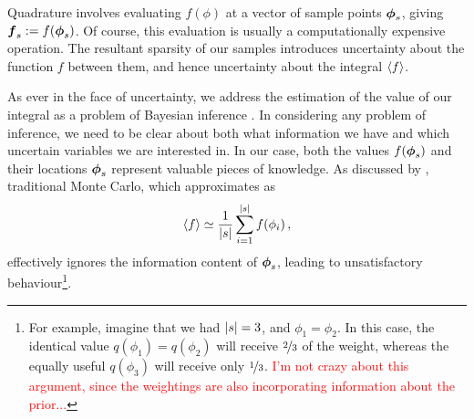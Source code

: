 \documentclass{article}
\begin{document}
Quadrature involves evaluating $f(\phi)$ at a
vector of sample points $\vph_s$, giving $\vf\pha_s\deq
f(\vph_s)$. Of course, this evaluation is usually a computationally expensive
operation.
The resultant sparsity of our samples introduces uncertainty about the function $f$ between them, and hence uncertainty about the integral $\inty{f}$.

As ever in the face of uncertainty, we address the estimation of the value of our integral as a problem of Bayesian inference \citep{BZNumericalAnalysis}. In considering any problem of inference, we need to be clear about both what information we have and which uncertain variables we are interested in. In our case, both the values $f(\vphS)$ and their locations $\vphS$ represent valuable pieces of knowledge. As discussed by \citet{MCUnsound}, traditional Monte Carlo, which approximates as
\begin{equation} \label{eq:MC_integral_estimate}
\inty{f} \simeq \frac{1}{\card{s}} \sum_{i=1}^{\card{s}} f(\phi_i)\,,
\end{equation}
effectively ignores the information content of $\vphS$, leading to unsatisfactory behaviour\footnote{
  For example, imagine that we had $\card{s}=3$, and $\phi_1 = \phi_2$. In this case, the identical value $q(\phi_1)= q(\phi_2)$ will receive $\nicefrac{2}{3}$ of the weight, whereas the equally useful $q(\phi_3)$ will receive only $\nicefrac{1}{3}$. \textcolor{red}{I'm not crazy about this argument, since the weightings are also incorporating information about the prior...} }.

\end{document}
